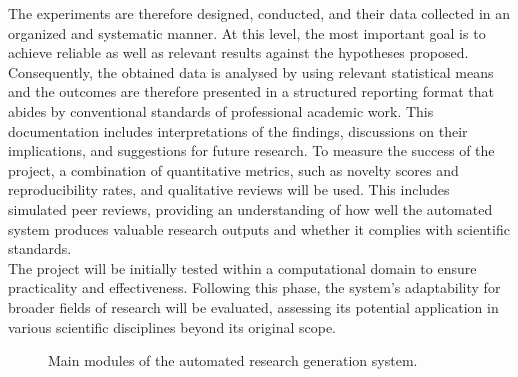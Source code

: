 The experiments are therefore designed, conducted, and their data collected in an organized and systematic manner. At this level, the most important goal is to achieve reliable as well as relevant results against the hypotheses proposed. Consequently, the obtained data is analysed by using relevant statistical means and the outcomes are therefore presented in a structured reporting format that abides by conventional standards of professional academic work. This documentation includes interpretations of the findings, discussions on their implications, and suggestions for future research. To measure the success of the project, a combination of quantitative metrics, such as novelty scores and reproducibility rates, and qualitative reviews will be used. This includes simulated peer reviews, providing an understanding of how well the automated system produces valuable research outputs and whether it complies with scientific standards. \\
The project will be initially tested within a computational domain to ensure practicality and effectiveness. Following this phase, the system's adaptability for broader fields of research will be evaluated, assessing its potential application in various scientific disciplines beyond its original scope.

\begin{figure}[htbp]
    \centering
    \caption{Main modules of the automated research generation system.}
    \label{fig:level2} %
\end{figure}


